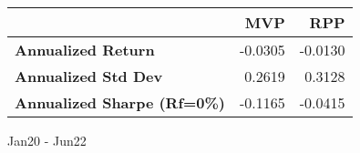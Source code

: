 
\begin{tabular}{lrr}
	\toprule
	                                    & MVP     & RPP     \\
	\midrule
	\textbf{Annualized Return}          & -0.0305 & -0.0130 \\
	\textbf{Annualized Std Dev}         & 0.2619  & 0.3128  \\
	\textbf{Annualized Sharpe (Rf=0\%)} & -0.1165 & -0.0415 \\
	\bottomrule
\end{tabular} \caption{Jan20 - Jun22}